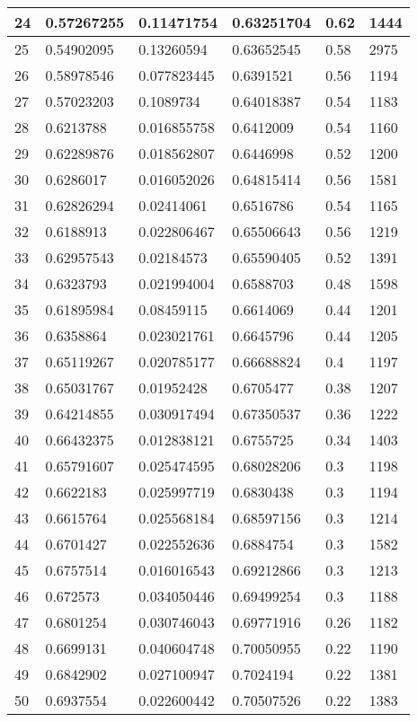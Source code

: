 \begin{longtable}{|l|l|l|l|l|l|}
24 & 0.57267255 & 0.11471754 & 0.63251704 & 0.62 & 1444 \\ \hline 
25 & 0.54902095 & 0.13260594 & 0.63652545 & 0.58 & 2975 \\ \hline 
26 & 0.58978546 & 0.077823445 & 0.6391521 & 0.56 & 1194 \\ \hline 
27 & 0.57023203 & 0.1089734 & 0.64018387 & 0.54 & 1183 \\ \hline 
28 & 0.6213788 & 0.016855758 & 0.6412009 & 0.54 & 1160 \\ \hline 
29 & 0.62289876 & 0.018562807 & 0.6446998 & 0.52 & 1200 \\ \hline 
30 & 0.6286017 & 0.016052026 & 0.64815414 & 0.56 & 1581 \\ \hline 
31 & 0.62826294 & 0.02414061 & 0.6516786 & 0.54 & 1165 \\ \hline 
32 & 0.6188913 & 0.022806467 & 0.65506643 & 0.56 & 1219 \\ \hline 
33 & 0.62957543 & 0.02184573 & 0.65590405 & 0.52 & 1391 \\ \hline 
34 & 0.6323793 & 0.021994004 & 0.6588703 & 0.48 & 1598 \\ \hline 
35 & 0.61895984 & 0.08459115 & 0.6614069 & 0.44 & 1201 \\ \hline 
36 & 0.6358864 & 0.023021761 & 0.6645796 & 0.44 & 1205 \\ \hline 
37 & 0.65119267 & 0.020785177 & 0.66688824 & 0.4 & 1197 \\ \hline 
38 & 0.65031767 & 0.01952428 & 0.6705477 & 0.38 & 1207 \\ \hline 
39 & 0.64214855 & 0.030917494 & 0.67350537 & 0.36 & 1222 \\ \hline 
40 & 0.66432375 & 0.012838121 & 0.6755725 & 0.34 & 1403 \\ \hline 
41 & 0.65791607 & 0.025474595 & 0.68028206 & 0.3 & 1198 \\ \hline 
42 & 0.6622183 & 0.025997719 & 0.6830438 & 0.3 & 1194 \\ \hline 
43 & 0.6615764 & 0.025568184 & 0.68597156 & 0.3 & 1214 \\ \hline 
44 & 0.6701427 & 0.022552636 & 0.6884754 & 0.3 & 1582 \\ \hline 
45 & 0.6757514 & 0.016016543 & 0.69212866 & 0.3 & 1213 \\ \hline 
46 & 0.672573 & 0.034050446 & 0.69499254 & 0.3 & 1188 \\ \hline 
47 & 0.6801254 & 0.030746043 & 0.69771916 & 0.26 & 1182 \\ \hline 
48 & 0.6699131 & 0.040604748 & 0.70050955 & 0.22 & 1190 \\ \hline 
49 & 0.6842902 & 0.027100947 & 0.7024194 & 0.22 & 1381 \\ \hline 
50 & 0.6937554 & 0.022600442 & 0.70507526 & 0.22 & 1383 \\ \hline 
\end{longtable}